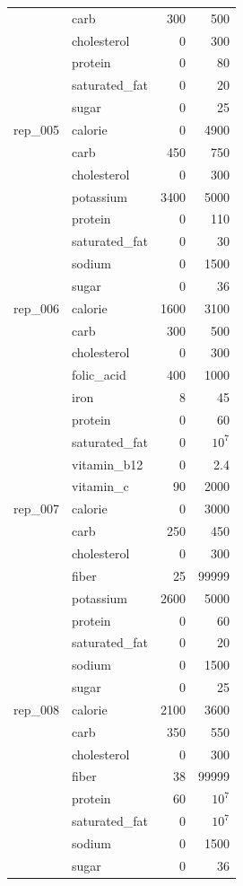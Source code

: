 \begin{tabular}{@{}clrr@{}}
 & carb & 300 & 500 \\
 & cholesterol & 0 & 300 \\
 & protein & 0 & 80 \\
 & saturated\_fat & 0 & 20 \\
 & sugar & 0 & 25 \\
\midrule
rep\_005 & calorie & 0 & 4900 \\
 & carb & 450 & 750 \\
 & cholesterol & 0 & 300 \\
 & potassium & 3400 & 5000 \\
 & protein & 0 & 110 \\
 & saturated\_fat & 0 & 30 \\
 & sodium & 0 & 1500 \\
 & sugar & 0 & 36 \\
\midrule
rep\_006 & calorie & 1600 & 3100 \\
 & carb & 300 & 500 \\
 & cholesterol & 0 & 300 \\
 & folic\_acid & 400 & 1000 \\
 & iron & 8 & 45 \\
 & protein & 0 & 60 \\
 & saturated\_fat & 0 & $10^{7}$ \\
 & vitamin\_b12 & 0 & 2.4 \\
 & vitamin\_c & 90 & 2000 \\
\midrule
rep\_007 & calorie & 0 & 3000 \\
 & carb & 250 & 450 \\
 & cholesterol & 0 & 300 \\
 & fiber & 25 & 99999 \\
 & potassium & 2600 & 5000 \\
 & protein & 0 & 60 \\
 & saturated\_fat & 0 & 20 \\
 & sodium & 0 & 1500 \\
 & sugar & 0 & 25 \\
\midrule
rep\_008 & calorie & 2100 & 3600 \\
 & carb & 350 & 550 \\
 & cholesterol & 0 & 300 \\
 & fiber & 38 & 99999 \\
 & protein & 60 & $10^{7}$ \\
 & saturated\_fat & 0 & $10^{7}$ \\
 & sodium & 0 & 1500 \\
 & sugar & 0 & 36 \\

\end{tabular}
